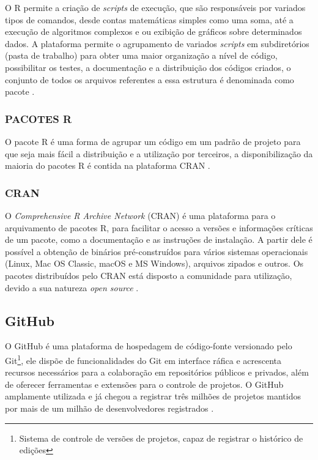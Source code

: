 O R permite a criação de \textit{scripts} de execução, que são responsáveis por variados tipos de comandos, desde contas matemáticas simples como uma soma, até a execução de algoritmos complexos e ou exibição de gráficos sobre determinados dados. A plataforma permite o agrupamento de variados \textit{scripts} em subdiretórios (pasta de trabalho) para obter uma maior organização a nível de código, possibilitar os testes, a documentação e a distribuição dos códigos criados, o conjunto de todos os arquivos referentes a essa estrutura é denominada como pacote \cite{website:Hornik2018}.

\subsubsection{PACOTES R}

O pacote R é uma forma de agrupar um código em um padrão de projeto para que seja mais fácil a distribuição e a utilização por terceiros, a disponibilização da maioria do pacotes R é contida na plataforma CRAN \cite{website:Hornik2018}.



\subsubsection{CRAN}

O \textit{Comprehensive R Archive Network} (CRAN) é uma plataforma para o arquivamento de pacotes R, para facilitar o acesso a versões e informações críticas de um pacote, como a documentação e as instruções de instalação. A partir dele é possível a obtenção de binários pré-construídos para vários sistemas operacionais (Linux, Mac OS Classic, macOS e MS Windows), arquivos zipados e outros. Os pacotes distribuídos pelo CRAN está disposto a comunidade para utilização, devido a sua natureza \textit{open source} \cite{website:Hornik2018}.

\subsection{GitHub}

O GitHub \cite{GitHub2019} é uma plataforma de hospedagem de código-fonte versionado pelo Git\footnote{Sistema de controle de versões de projetos, capaz de registrar o histórico de edições}, ele dispõe de funcionalidades do Git em interface ráfica e acrescenta recursos necessários para a colaboração em repositórios públicos e privados, além de oferecer ferramentas e extensões para o controle de projetos. O GitHub amplamente utilizada e já chegou a registrar três milhões de projetos mantidos por mais de um milhão de desenvolvedores registrados \cite{Thung2013}.

